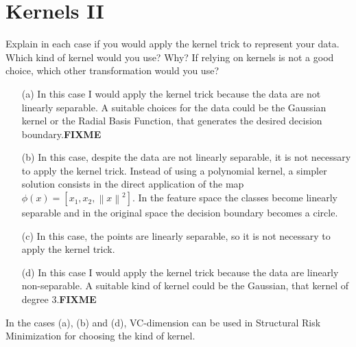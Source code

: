 \section{Kernels II}

Explain in each case if you would apply the kernel trick to represent your 
data. Which kind of kernel would you use? Why? If relying on kernels is not 
a good choice, which other transformation would you use?
\begin{itemize}
	\item[(a)] In this case I would apply the kernel trick because the data are 
	not	linearly separable. %
	A suitable choices for the data could be the Gaussian kernel or the Radial 
	Basis Function, that generates the desired decision boundary.\textbf{FIXME}
	
	\item[(b)] In this case, despite the data are not linearly separable, it is 
	not necessary to apply the kernel trick. Instead of using a polynomial  
	kernel, a simpler solution consists in the direct application of the map 
	$\phi(x)=[x_1, x_2, {\left\| x\right\|}^{2}]$. In the feature space the 
	classes become linearly separable and in the original space the decision 
	boundary becomes a circle.
	
	\item[(c)] In this case, the points are linearly separable, so it is not 
	necessary to apply the kernel trick.  
	
	\item[(d)] In this case I would apply the kernel trick because the data 
	are linearly non-separable. A suitable kind of kernel could be the 
	Gaussian, that kernel of degree $3$.\textbf{FIXME}
	
\end{itemize}
In the cases (a), (b) and (d), VC-dimension can be used in Structural Risk 
Minimization for choosing the kind of kernel.
